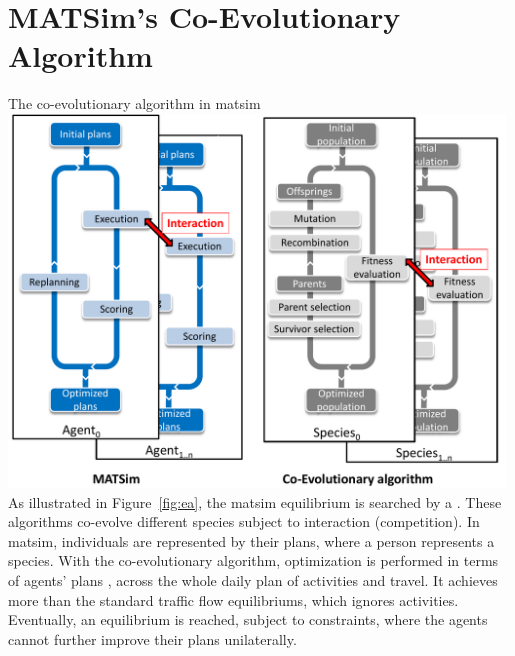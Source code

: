 \section{MATSim's Co-Evolutionary Algorithm}
\label{sec:co-ev}
%
%
{The co-evolutionary algorithm in \protect\gls{matsim}%
%
}%
{\label{fig:ea}}%
{\includegraphics[width=0.99\textwidth, angle=0]{using/figures/MATSimVSea.pdf}}%
{}
%
%
As illustrated in Figure~\ref{fig:ea}, the \gls{matsim} equilibrium is searched by a \emph{} \citep[see e.g.,][]{PopoviciEtAl_2012}. These \glspl{algorithm} co-evolve different species subject to interaction (\eg competition). In \gls{matsim}, individuals are represented by their plans, where a person represents a species. With the co-evolutionary algorithm, optimization is performed in terms of agents' plans , \ie across the whole daily plan of activities and travel. It achieves more than the standard traffic flow \glspl{equilibrium}, which ignores activities. Eventually, an equilibrium is reached, subject to constraints, where the agents cannot further improve their plans unilaterally. 

